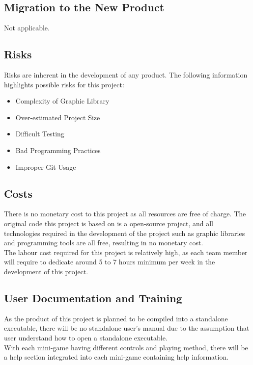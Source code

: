 \documentclass[12pt, titlepage]{article}
\begin{document}
\subsection{Migration to the New Product}

Not applicable.

\subsection{Risks}

Risks are inherent in the development of any product. The following information highlights possible risks for this project:
\begin{itemize}
    \item Complexity of Graphic Library
    \item Over-estimated Project Size
    \item Difficult Testing
    \item Bad Programming Practices
    \item Improper Git Usage
\end{itemize}

\subsection{Costs}

There is no monetary cost to this project as all resources are free of charge. The original code this project is based on is a open-source project, and all technologies required in the development of the project such as graphic libraries and programming tools are all free, resulting in no monetary cost.\\
The labour cost required for this project is relatively high, as each team member will require to dedicate around 5 to 7 hours minimum per week in the development of this project.

\subsection{User Documentation and Training}

As the product of this project is planned to be compiled into a standalone executable, there will be no standalone user's manual due to the assumption that user understand how to open a standalone executable.\\
With each mini-game having different controls and playing method, there will be a help section integrated into each mini-game containing help information.
\end{document}
